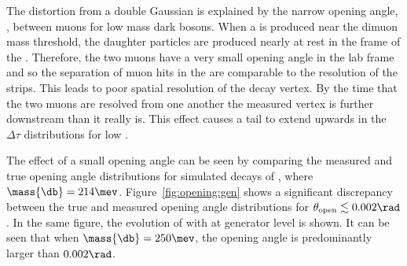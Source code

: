 The distortion from a double Gaussian is explained by the narrow opening angle, \thetaopen, between
muons for low mass dark bosons.
When a \db is produced near the dimuon mass threshold, the daughter particles are produced nearly
at rest in the frame of the \db.
Therefore, the two muons have a very small opening angle in the lab frame and so the separation of
muon hits in the \velo are comparable to the resolution of the \velo strips.
This leads to poor spatial resolution of the \db decay vertex.
By the time that the two muons are resolved from one another the measured vertex is further
downstream than it really is.
This effect causes a tail to extend upwards in the $\Delta\tau$ distributions for low \mdb.

The effect of a small opening angle can be seen by comparing the measured and true opening angle
distributions for simulated decays of \btokstrdb, where $\mass{\db}=214\mev$.
Figure~\ref{fig:opening:gen} shows a significant discrepancy between the
true and measured opening angle
distributions for $\theta_\mathrm{open}\lesssim0.002\rad$.
In the same figure, the evolution of \thetaopen with \mass{\db} at generator level is shown.
It can be seen that when $\mass{\db}=250\mev$, the opening angle is predominantly larger than $0.002\rad$.


